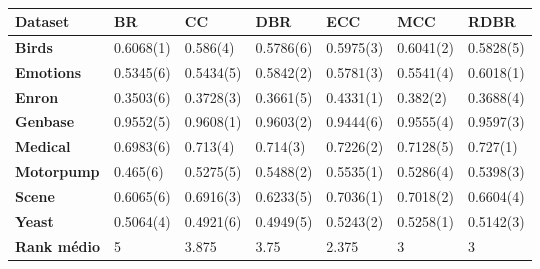 \begin{table}[\tabmode]
\begin{tabular}{lllllll}
\hline
\textbf{Dataset}    & \textbf{BR} & \textbf{CC} & \textbf{DBR} & \textbf{ECC} & \textbf{MCC} & \textbf{RDBR} \\ \hline
\textbf{Birds}      & 0.6068(1)   & 0.586(4)    & 0.5786(6)    & 0.5975(3)    & 0.6041(2)    & 0.5828(5)     \\
\textbf{Emotions}   & 0.5345(6)   & 0.5434(5)   & 0.5842(2)    & 0.5781(3)    & 0.5541(4)    & 0.6018(1)     \\
\textbf{Enron}      & 0.3503(6)   & 0.3728(3)   & 0.3661(5)    & 0.4331(1)    & 0.382(2)     & 0.3688(4)     \\
\textbf{Genbase}    & 0.9552(5)   & 0.9608(1)   & 0.9603(2)    & 0.9444(6)    & 0.9555(4)    & 0.9597(3)     \\
\textbf{Medical}    & 0.6983(6)   & 0.713(4)    & 0.714(3)     & 0.7226(2)    & 0.7128(5)    & 0.727(1)      \\
\textbf{Motorpump}  & 0.465(6)    & 0.5275(5)   & 0.5488(2)    & 0.5535(1)    & 0.5286(4)    & 0.5398(3)     \\
\textbf{Scene}      & 0.6065(6)   & 0.6916(3)   & 0.6233(5)    & 0.7036(1)    & 0.7018(2)    & 0.6604(4)     \\
\textbf{Yeast}      & 0.5064(4)   & 0.4921(6)   & 0.4949(5)    & 0.5243(2)    & 0.5258(1)    & 0.5142(3)     \\ \hline
\textbf{Rank médio} & 5           & 3.875       & 3.75         & 2.375        & 3            & 3             \\ \hline
\end{tabular}
\caption{}
\label{tab:EBAsvm}
\end{table}